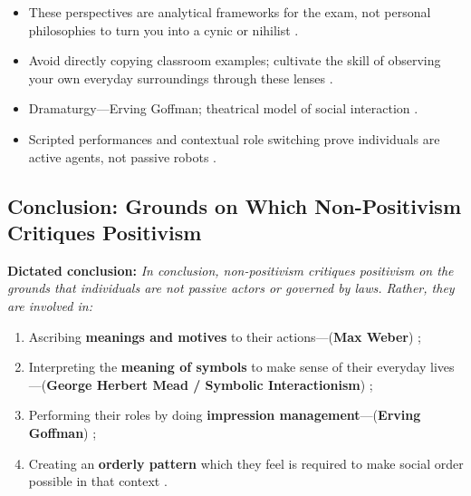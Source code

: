 \begin{CriticalPoint}
\begin{itemize}
    \item These perspectives are analytical frameworks for the exam, not personal philosophies to turn you into a cynic or nihilist .
    \item Avoid directly copying classroom examples; cultivate the skill of observing your own everyday surroundings through these lenses .
\end{itemize}
\end{CriticalPoint}

\begin{QuickRevision}
\begin{itemize}
    \item Dramaturgy---Erving Goffman; theatrical model of social interaction .
    \item Scripted performances and contextual role switching prove individuals are active agents, not passive robots .
\end{itemize}
\end{QuickRevision}

\subsection{Conclusion: Grounds on Which Non-Positivism Critiques Positivism}

\begin{KeyConcept}
\textbf{Dictated conclusion:} \textit{In conclusion, non-positivism critiques positivism on the grounds that individuals are not passive actors or governed by laws. Rather, they are involved in:} 
\begin{enumerate}
    \item Ascribing \textbf{meanings and motives} to their actions---(\textbf{Max Weber}) ;
    \item Interpreting the \textbf{meaning of symbols} to make sense of their everyday lives---(\textbf{George Herbert Mead / Symbolic Interactionism}) ;
    \item Performing their roles by doing \textbf{impression management}---(\textbf{Erving Goffman}) ;
    \item Creating an \textbf{orderly pattern} which they feel is required to make social order possible in that context .
\end{enumerate}
\end{KeyConcept}

